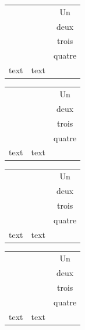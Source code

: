 \documentclass[dvipsnames]{article}
\begin{document}
\medskip
\begin{scope}

\begin{Code}
\end{Code}

\bigskip

\begin{Code}[width=10cm,show-output]
\begin{NiceTabular}{ccc}
 & & \Huge Un\\
 & & deux  \\
 & & trois  \\
 & & \Huge quatre  \\
text & text \\
\end{NiceTabular}
\end{Code}


\bigskip
\begin{Code}[width=10cm,show-output]
\begin{NiceTabular}{ccc}
 & & \Huge Un\\
 & & deux  \\
 & & trois  \\
 & & \Huge quatre  \\
text & text \\
\end{NiceTabular}
\end{Code}

\bigskip
\begin{Code}[width=10cm,show-output]
\begin{NiceTabular}{ccc}
 & & \Huge Un\\
 & & deux  \\
 & & trois  \\
 & & \Huge quatre  \\
text & text \\
\end{NiceTabular}
\end{Code}


\bigskip
\begin{Code}[width=10cm,show-output]
\begin{NiceTabular}{ccc}
 & & \Huge Un\\
 & & deux  \\
 & & trois  \\
 & & \Huge quatre  \\
text & text \\
\end{NiceTabular}
\end{Code}

\end{scope}
\end{document}
